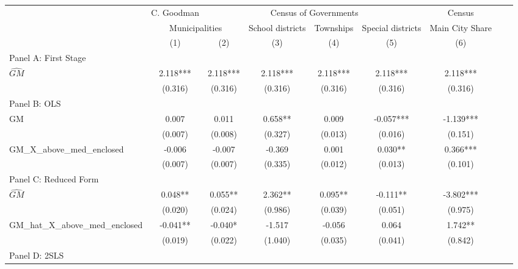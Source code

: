  \begin{tabular}{l*{8}{c}} \toprule
&\multicolumn{1}{c}{C. Goodman}&\multicolumn{4}{c}{Census of Governments}&\multicolumn{1}{c}{Census}\\\cmidrule(lr){2-2}\cmidrule(lr){3-6}\cmidrule(lr){7-7}
&\multicolumn{2}{c}{Municipalities}&\multicolumn{1}{c}{School districts}&\multicolumn{1}{c}{Townships}&\multicolumn{1}{c}{Special districts}&\multicolumn{1}{c}{Main City Share}\\\cmidrule(lr){2-3}\cmidrule(lr){4-6}\cmidrule(lr){7-7}
&\multicolumn{1}{c}{(1)}&\multicolumn{1}{c}{(2)}&\multicolumn{1}{c}{(3)}&\multicolumn{1}{c}{(4)}&\multicolumn{1}{c}{(5)}&\multicolumn{1}{c}{(6)}\\
\cmidrule(lr){1-7}
\multicolumn{6}{l}{Panel A: First Stage}\\
\cmidrule(lr){1-7}
$\widehat{GM}$  &    2.118***&    2.118***&    2.118***&    2.118***&    2.118***&    2.118***\\
                &  (0.316)   &  (0.316)   &  (0.316)   &  (0.316)   &  (0.316)   &  (0.316)   \\
\cmidrule(lr){1-7}
\multicolumn{6}{l}{Panel B: OLS}\\
\cmidrule(lr){1-7}
GM              &    0.007   &    0.011   &    0.658** &    0.009   &   -0.057***&   -1.139***\\
                &  (0.007)   &  (0.008)   &  (0.327)   &  (0.013)   &  (0.016)   &  (0.151)   \\
\addlinespace
GM\_X\_above\_med\_enclosed&   -0.006   &   -0.007   &   -0.369   &    0.001   &    0.030** &    0.366***\\
                &  (0.007)   &  (0.007)   &  (0.335)   &  (0.012)   &  (0.013)   &  (0.101)   \\
\cmidrule(lr){1-7}
\multicolumn{6}{l}{Panel C: Reduced Form}\\
\cmidrule(lr){1-7}
$\widehat{GM}$  &    0.048** &    0.055** &    2.362** &    0.095** &   -0.111** &   -3.802***\\
                &  (0.020)   &  (0.024)   &  (0.986)   &  (0.039)   &  (0.051)   &  (0.975)   \\
\addlinespace
GM\_hat\_X\_above\_med\_enclosed&   -0.041** &   -0.040*  &   -1.517   &   -0.056   &    0.064   &    1.742** \\
                &  (0.019)   &  (0.022)   &  (1.040)   &  (0.035)   &  (0.041)   &  (0.842)   \\
\cmidrule(lr){1-7}
\multicolumn{6}{l}{Panel D: 2SLS}\\

\end{tabular}
